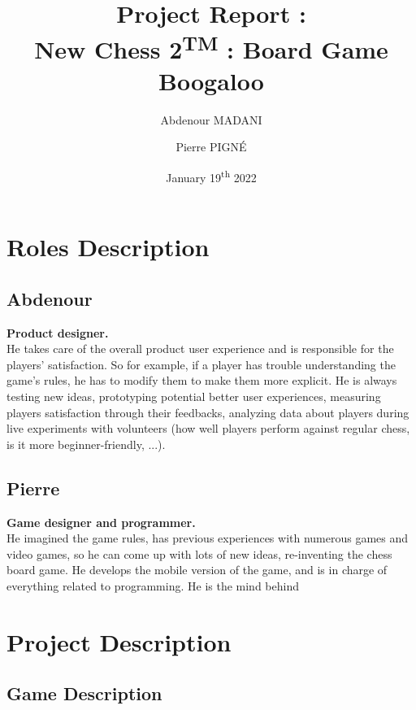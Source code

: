 \documentclass[12pt]{article}
\begin{document}
    
    \title{Project Report :\\\textbf{New Chess 2\textsuperscript{TM} : Board Game Boogaloo}}
    \author{Abdenour MADANI \and Pierre PIGNÉ}
    \date{January 19\textsuperscript{th} 2022}
    \maketitle
    \newpage
    
    \tableofcontents
    \newpage
    
    \section{Roles Description}
        \subsection{Abdenour}
            \textbf{Product designer.}
            \\ He takes care of the overall product user experience and is responsible for the players' satisfaction. So for example, if a player has trouble understanding the game's rules, he has to modify them to make them more explicit. He is always testing new ideas, prototyping potential better user experiences, measuring players satisfaction through their feedbacks, analyzing data about players during live experiments with volunteers (how well players perform against regular chess, is it more beginner-friendly, ...).
            
        \subsection{Pierre}
            \textbf{Game designer and programmer.}
            \\He imagined the game rules, has previous experiences with numerous games and video games, so he can come up with lots of new ideas, re-inventing the chess board game.
            He develops the mobile version of the game, and is in charge of everything related to programming. He is the mind behind
    
    \section{Project Description}
        \subsection{Game Description}
\end{document}
